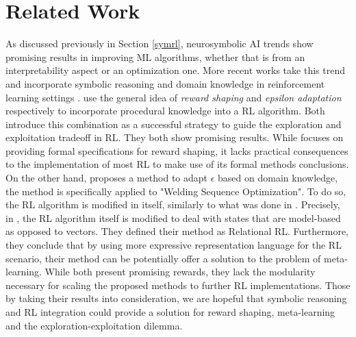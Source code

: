 \section{Related Work}

As discussed previously in Section \ref{symrl}, neurosymbolic AI trends show promising results in improving ML algorithms, whether that is from 
an interpretability aspect or an optimization one. More recent works take this trend and incorporate symbolic reasoning and 
domain knowledge in reinforcement learning settings \cite{Driessens2010,Romero2020,achiam2017,marek2010}. \cite{marek2010,Romero2020} use the general idea of \textit{reward shaping} and \textit{epsilon adaptation} respectively 
to incorporate procedural knowledge into a RL algorithm. Both introduce this combination as a successful strategy to guide the exploration and exploitation tradeoff in RL. They both show promising results. While 
\cite{marek2010} focuses on providing formal specifications for reward shaping, it lacks practical 
consequences to the implementation of most RL to make use of its formal methods conclusions. On the other hand, \cite{Romero2020} proposes a method to adapt $\epsilon$ based on domain knowledge, the method is specifically applied to "Welding Sequence Optimization".  
To do so, the RL algorithm is modified in itself, similarly to what was done in \cite{Driessens2010}. Precisely, in \cite{Driessens2010}, the RL algorithm itself is 
modified to deal with states that are model-based as opposed to vectors. They defined their method as Relational RL. 
Furthermore, they conclude that by using more expressive representation language for the RL scenario, their method can be potentially offer a solution to the problem of meta-learning. 
While \cite{Romero2020,Driessens2010} both present promising rewards, they lack the modularity necessary for scaling the proposed methods to further RL implementations. Those by taking their results into consideration, 
we are hopeful that symbolic reasoning and RL integration could provide a solution for reward shaping, meta-learning and the exploration-exploitation dilemma. 
